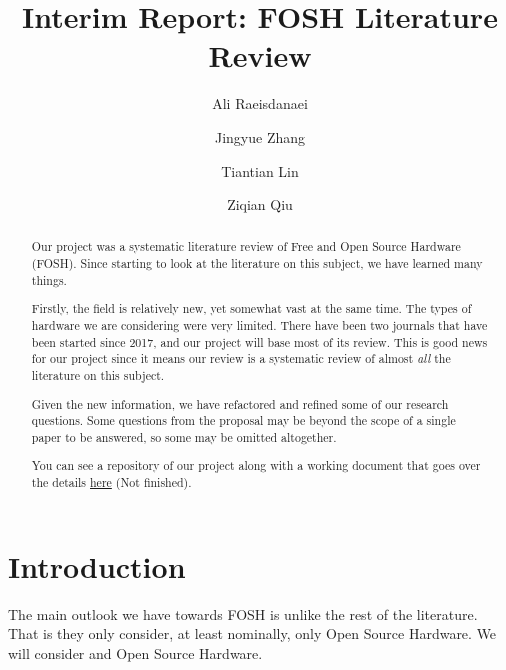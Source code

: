\documentclass[acmtog]{acmart}
\begin{document}
\title{Interim Report: FOSH Literature Review}

\author{Ali Raeisdanaei}

\author{Jingyue Zhang}

\author{Tiantian Lin}

\author{Ziqian Qiu}

\begin{abstract}
Our project was a systematic literature review of Free and Open Source Hardware (FOSH).
Since starting to look at the literature on this subject, we have learned many things. 

Firstly, the field is relatively new, yet somewhat vast at the same time. 
The types of hardware we are considering were very limited.
There have been two journals that have been started since 2017, and our project will base most of its review. 
This is good news for our project since it means our review is a systematic review of almost \textit{all} the literature on this subject. 

Given the new information, we have refactored and refined some of our research questions. 
Some questions from the proposal may be beyond the scope of a single paper to be answered, so some may be omitted altogether. 

You can see a repository of our project along with a working document that goes over the details
\href{https://github.com/aliraeisdanaei/FOSH_Lit_Review/}{here}
(Not finished).
\end{abstract}



\maketitle

\section{Introduction}
The main outlook we have towards FOSH is unlike the rest of the literature. 
That is they only consider, at least nominally, only Open Source Hardware. 
We will consider  and Open Source Hardware. 
\end{document}
